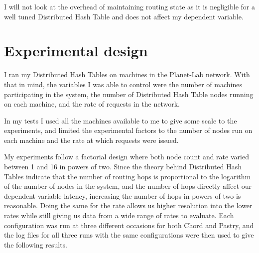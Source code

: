 I will not look at the overhead of maintaining routing state as it is negligible for a well tuned Distributed Hash Table \cite{myths} and does not affect my dependent variable.

\section{Experimental design}
I ran my Distributed Hash Tables on machines in the Planet-Lab network. With that in mind, the variables I was able to control were the number of machines participating in the system, the number of Distributed Hash Table nodes running on each machine, and the rate of requests in the network.

In my tests I used all the machines available to me to give some scale to the experiments, and limited the experimental factors to the number of nodes run on each machine and the rate at which requests were issued.

My experiments follow a factorial design where both node count and rate varied between 1 and 16 in powers of two. Since the theory behind Distributed Hash Tables indicate that the number of routing hops is proportional to the logarithm of the number of nodes in the system, and the number of hops directly affect our dependent variable latency, increasing the number of hops in powers of two is reasonable. Doing the same for the rate allows us higher resolution into the lower rates while still giving us data from a wide range of rates to evaluate.
Each configuration was run at three different occasions for both Chord and Pastry, and the log files for all three runs with the same configurations were then used to give the following results.

